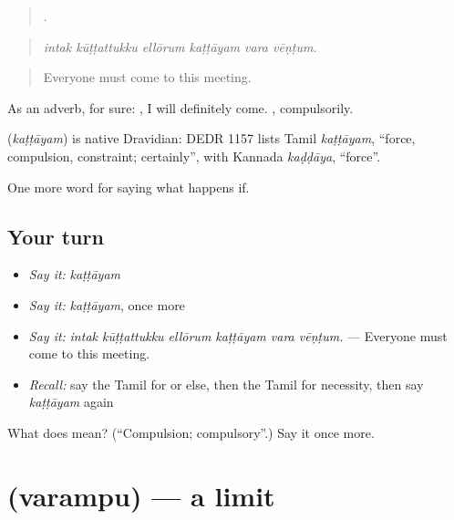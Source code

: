 \begin{quote}
     .
\end{quote}

\begin{quote}
\emph{intak kūṭṭattukku ellōrum kaṭṭāyam vara vēṇṭum.}
\end{quote}

\begin{quote}
Everyone must come to this meeting.
\end{quote}

As an adverb, for sure:  , I will definitely come. , compulsorily.

\begin{cousinweb}
\textbf{} (\emph{kaṭṭāyam}) is native Dravidian: DEDR 1157 lists Tamil \emph{kaṭṭāyam}, \textquotedblleft{}force, compulsion, constraint; certainly\textquotedblright{}, with Kannada \emph{kaḍḍāya}, \textquotedblleft{}force\textquotedblright{}.
\end{cousinweb}

\begin{grammarlens}[title={What you've built}]
One more word for saying what happens if.
\end{grammarlens}

\subsection*{Your turn}
\begin{itemize}
\raggedright
  \item \emph{Say it:} \emph{kaṭṭāyam}
  \item \emph{Say it:} \emph{kaṭṭāyam}, once more
  \item \emph{Say it:} \emph{intak kūṭṭattukku ellōrum kaṭṭāyam vara vēṇṭum.} — Everyone must come to this meeting.
  \item \emph{Recall:} say the Tamil for or else, then the Tamil for necessity, then say \emph{kaṭṭāyam} again
\end{itemize}

\begin{tcolorbox}[breakable,colback=teal!4,colframe=teal!35!black,title={Before you move on}]
What does  mean? (\textquotedblleft{}Compulsion; compulsory\textquotedblright{}.) Say it once more.
\end{tcolorbox}
\section[\texorpdfstring{\ta{வரம்பு} (varampu)}{வரம்பு (varampu)}]{ (varampu) — a limit}

